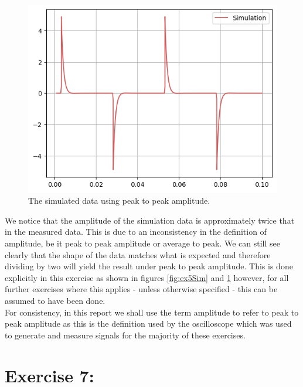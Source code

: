 \documentclass[%
reprint,
amsmath,amssymb,
aps,
floatfix
]{revtex4-2}
\begin{document}
		\begin{figure}
			\includegraphics[width=0.85\columnwidth]{ex5_simPlotAdj.png}
			\caption{\label{fig:ex5SimAdj}The simulated data using peak to peak amplitude.}
		\end{figure}
	
		We notice that the amplitude of the simulation data is approximately twice that in the measured data. This is due to an inconsistency in the definition of amplitude, be it peak to peak amplitude or average to peak. We can still see clearly that the shape of the data matches what is expected and therefore dividing by two will yield the result under peak to peak amplitude. This is done explicitly in this exercise as shown in figures \ref{fig:ex5Sim} and \ref{fig:ex5SimAdj} however, for all further exercises where this applies - unless otherwise specified - this can be assumed to have been done.\\
		
		For consistency, in this report we shall use the term amplitude to refer to peak to peak amplitude as this is the definition used by the oscilloscope which was used to generate and measure signals for the majority of these exercises.
		
	\section{Exercise 7: }
\end{document}
